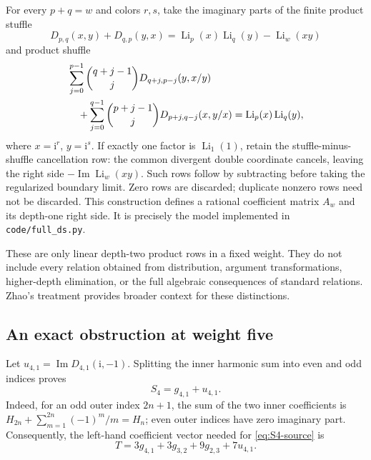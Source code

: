 \documentclass[11pt,a4paper]{article}
\numberwithin{equation}{section}
\theoremstyle{definition}
\theoremstyle{remark}
\newcommand{\Li}{\operatorname{Li}}
\newcommand{\Imag}{\operatorname{Im}}
\newcommand{\ii}{\mathrm{i}}
\begin{document}
For every $p+q=w$ and colors $r,s$, take the imaginary parts of the finite product stuffle
\begin{equation}\label{eq:full-stuffle}
 D_{p,q}(x,y)+D_{q,p}(y,x)=\Li_p(x)\Li_q(y)-\Li_w(xy)
\end{equation}
and product shuffle
\begin{align}\label{eq:full-shuffle}
 &\sum_{j=0}^{p-1}\binom{q+j-1}{j}D_{q+j,p-j}(y,x/y)\notag\\
 &\quad+\sum_{j=0}^{q-1}\binom{p+j-1}{j}D_{p+j,q-j}(x,y/x)
 =\Li_p(x)\Li_q(y),
\end{align}
where $x=\ii^r$, $y=\ii^s$. If exactly one factor is $\Li_1(1)$, retain the stuffle-minus-shuffle cancellation row: the common divergent double coordinate cancels, leaving the right side $-\Imag\Li_w(xy)$. Such rows follow by subtracting before taking the regularized boundary limit. Zero rows are discarded; duplicate nonzero rows need not be discarded. This construction defines a rational coefficient matrix $A_w$ and its depth-one right side. It is precisely the model implemented in \texttt{code/full\_ds.py}.

These are only linear depth-two product rows in a fixed weight. They do not include every relation obtained from distribution, argument transformations, higher-depth elimination, or the full algebraic consequences of standard relations. Zhao's treatment \cite{Zhao} provides broader context for these distinctions.

\subsection{An exact obstruction at weight five}
Let $u_{4,1}=\Imag D_{4,1}(\ii,-1)$. Splitting the inner harmonic sum into even and odd indices proves
\begin{equation}\label{eq:S4-color}
 S_4=g_{4,1}+u_{4,1}.
\end{equation}
Indeed, for an odd outer index $2n+1$, the sum of the two inner coefficients is
$H_{2n}+\sum_{m=1}^{2n}(-1)^m/m=H_n$; even outer indices have zero imaginary part.
Consequently, the left-hand coefficient vector needed for \eqref{eq:S4-source} is
\begin{equation}\label{eq:S4-target}
 T=3g_{4,1}+3g_{3,2}+9g_{2,3}+7u_{4,1}.
\end{equation}
\end{document}
